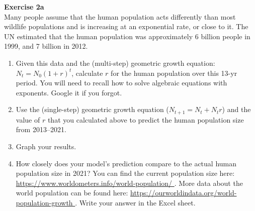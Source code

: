 \documentclass[12pt]{article}\usepackage[]{graphicx}\usepackage[]{xcolor}
\begin{document}








{\bf Exercise 2a \\}
Many people assume that the human population acts differently than
most wildlife populations and is increasing at an exponential rate, or
close to it. The UN estimated that the human population was approximately 6
billion people in 1999, and 7 billion in 2012. 

\begin{enumerate}
  \item Given this data and the (multi-step) geometric growth equation:
    $N_t = N_0(1+r)^t$, calculate $r$ for the human population over
    this 13-yr period. You will need to recall how to solve algebraic
    equations with exponents. Google it if you forgot.
  \item Use the (single-step) geometric growth equation ($N_{t+1} = N_t + N_t r$)
    and the value of $r$ that you calculated above to predict the
    human population size from 2013--2021.
  \item Graph your results.
  \item How closely does your model's prediction compare to the actual
    human population size in 2021? You can find the current population
    size here: \url{
      https://www.worldometers.info/world-population/
    }. More data about the world population can be found here: \url{
      https://ourworldindata.org/world-population-growth      
    }. Write your answer in the Excel sheet.
\end{enumerate}
\end{document}

